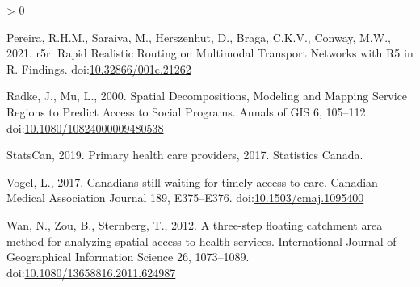 \documentclass[]{elsarticle} %
\newlength{\cslhangindent}
\newenvironment{CSLReferences}[2] %
 {%
  \setlength{\parindent}{0pt}
  \ifodd #1 \everypar{\setlength{\hangindent}{\cslhangindent}}\ignorespaces\fi
  \ifnum #2 > 0
  \setlength{\parskip}{#2\baselineskip}
  \fi
 }%
 {}
\begin{document}
\begin{CSLReferences}{1}{0}
\leavevmode\hypertarget{ref-pereira2021}{}%
Pereira, R.H.M., Saraiva, M., Herszenhut, D., Braga, C.K.V., Conway,
M.W., 2021. r5r: Rapid Realistic Routing on Multimodal Transport
Networks with R5 in R. Findings.
doi:\href{https://doi.org/10.32866/001c.21262}{10.32866/001c.21262}

\leavevmode\hypertarget{ref-radke2000}{}%
Radke, J., Mu, L., 2000. Spatial Decompositions, Modeling and Mapping
Service Regions to Predict Access to Social Programs. Annals of GIS 6,
105--112.
doi:\href{https://doi.org/10.1080/10824000009480538}{10.1080/10824000009480538}

\leavevmode\hypertarget{ref-statcan2019}{}%
StatsCan, 2019. Primary health care providers, 2017. Statistics Canada.

\leavevmode\hypertarget{ref-vogel2017}{}%
Vogel, L., 2017. Canadians still waiting for timely access to care.
Canadian Medical Association Journal 189, E375--E376.
doi:\href{https://doi.org/10.1503/cmaj.1095400}{10.1503/cmaj.1095400}

\leavevmode\hypertarget{ref-wan2012}{}%
Wan, N., Zou, B., Sternberg, T., 2012. A three-step floating catchment
area method for analyzing spatial access to health services.
International Journal of Geographical Information Science 26,
1073--1089.
doi:\href{https://doi.org/10.1080/13658816.2011.624987}{10.1080/13658816.2011.624987}

\end{CSLReferences}
\end{document}
